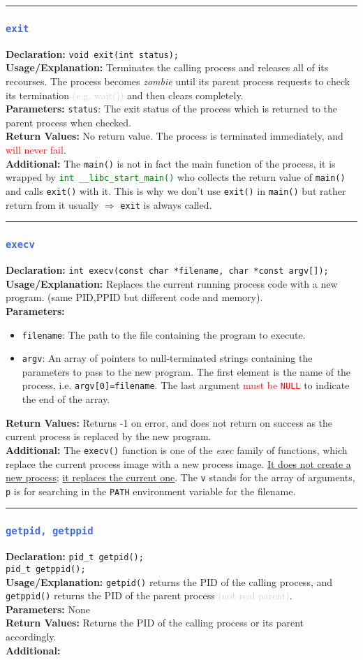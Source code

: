 \documentclass[openany,12pt]{book}
\newcommand{\code}[1]{\texttt{#1}}
\newcommand{\red}[1]{\textcolor{red}{#1}}
\newcommand{\blue}[1]{\textcolor{RoyalBlue}{#1}}
\newcommand{\gray}[1]{\textcolor{lightgray}{#1}}
\newcommand{\green}[1]{\textcolor{Green}{#1}}
\newcommand{\functionEntry}[6]{%
  \noindent\rule{\linewidth}{0.5pt}
  \subsubsection*{\blue{\large{\texttt{#1}}}}
  \textbf{Declaration:} \texttt{#2} \\
  \textbf{Usage/Explanation:} #3 \\
  \textbf{Parameters:} #4 \\
  \textbf{Return Values:} #5 \\
  \textbf{Additional:} #6
  \vspace{1em}
}
\newcommand{\functionEntryPar}[6]{%
  \noindent\rule{\linewidth}{0.5pt}
  \subsubsection*{\blue{\large{\texttt{#1}}}}
  \textbf{Declaration:} \texttt{#2} \\
  \textbf{Usage/Explanation:} #3 \\
  \textbf{Parameters:}
  \begin{itemize}[leftmargin=*]
    #4
  \end{itemize}
  \textbf{Return Values:} #5 \\
  \textbf{Additional:} #6
  \vspace{1em}
}
\begin{document}
\functionEntry{exit}
{void exit(int status);}
{Terminates the calling process and releases all of its recourses. The process becomes \textit{zombie} until its parent process requests to check its termination \gray{(e.g. wait())} and then clears completely.}
{\code{status}: The exit status of the process which is returned to the parent process when checked.}
{No return value. The process is terminated immediately, and \red{will never fail}.}
{The \code{main()} is not in fact the main function of the process, it is wrapped by \green{\code{int \_\_libc\_start\_main()}} who collects the return value of \code{main()} and calls \code{exit()} with it. This is why we don't use \code{exit()} in \code{main()} but rather return from it usually $\Longrightarrow$ \code{exit} is always called.\label{func:exit}}



\functionEntryPar{execv}
{int execv(const char *filename, char *const argv[]);}
{Replaces the current running process code with a new program. (same PID,PPID but different code and memory).}
{\item \code{filename}: The path to the file containing the program to execute.
  \item \code{argv}: An array of pointers to null-terminated strings containing the parameters to pass to the new program. The first element is the name of the process, i.e. \code{argv[0]=filename}. The last argument \red{must be \code{NULL}} to indicate the end of the array.}
{Returns -1 on error, and does not return on success as the current process is replaced by the new program.}
{The \code{execv()} function is one of the \textit{exec} family of functions, which replace the current process image with a new process image. \underline{It does not create a new process;} \underline{it replaces the current one}. The \code{v} stands for the array of arguments, \code{p} is for searching in the \code{PATH} environment variable for the filename. \label{func:execv}}



\functionEntry{getpid, getppid}
{pid\_t getpid();\\ pid\_t getppid();}
{\code{getpid()} returns the PID of the calling process, and \code{getppid()} returns the PID of the parent process \gray{(not real parent)}.}
{None}
{Returns the PID of the calling process or its parent accordingly.}
{\label{func:getpid}}
\end{document}
